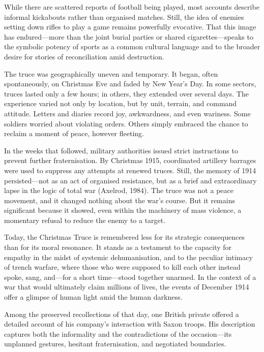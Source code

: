 While there are scattered reports of football being played, most accounts describe informal kickabouts rather than organised matches. Still, the idea of enemies setting down rifles to play a game remains powerfully evocative. That this image has endured—more than the joint burial parties or shared cigarettes—speaks to the symbolic potency of sports as a common cultural language and to the broader desire for stories of reconciliation amid destruction.

The truce was geographically uneven and temporary. It began, often spontaneously, on Christmas Eve and faded by New Year’s Day. In some sectors, truces lasted only a few hours; in others, they extended over several days. The experience varied not only by location, but by unit, terrain, and command attitude. Letters and diaries record joy, awkwardness, and even wariness. Some soldiers worried about violating orders. Others simply embraced the chance to reclaim a moment of peace, however fleeting.

In the weeks that followed, military authorities issued strict instructions to prevent further fraternisation. By Christmas 1915, coordinated artillery barrages were used to suppress any attempts at renewed truces. Still, the memory of 1914 persisted—not as an act of organised resistance, but as a brief and extraordinary lapse in the logic of total war (Axelrod, 1984). The truce was not a peace movement, and it changed nothing about the war’s course. But it remains significant because it showed, even within the machinery of mass violence, a momentary refusal to reduce the enemy to a target.

Today, the Christmas Truce is remembered less for its strategic consequences than for its moral resonance. It stands as a testament to the capacity for empathy in the midst of systemic dehumanisation, and to the peculiar intimacy of trench warfare, where those who were supposed to kill each other instead spoke, sang, and—for a short time—stood together unarmed. In the context of a war that would ultimately claim millions of lives, the events of December 1914 offer a glimpse of human light amid the human darkness.

Among the preserved recollections of that day, one British private offered a detailed account of his company’s interaction with Saxon troops. His description captures both the informality and the contradictions of the occasion—its unplanned gestures, hesitant fraternisation, and negotiated boundaries.

\vspace{0.5em}

